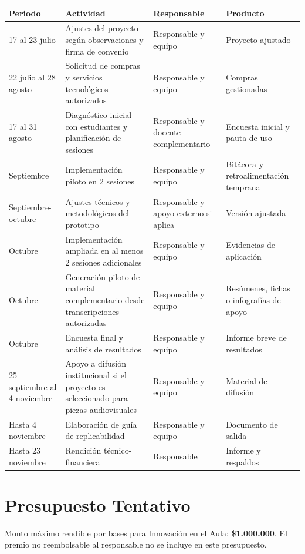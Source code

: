 \documentclass[11pt,letterpaper]{article}
\begin{document}
\begin{longtable}{p{3.1cm}p{5.6cm}p{3.2cm}p{3.2cm}}
\toprule
\textbf{Periodo} & \textbf{Actividad} & \textbf{Responsable} & \textbf{Producto} \\
\midrule
17 al 23 julio & Ajustes del proyecto según observaciones y firma de convenio & Responsable y equipo & Proyecto ajustado \\
22 julio al 28 agosto & Solicitud de compras y servicios tecnológicos autorizados & Responsable y equipo & Compras gestionadas \\
17 al 31 agosto & Diagnóstico inicial con estudiantes y planificación de sesiones & Responsable y docente complementario & Encuesta inicial y pauta de uso \\
Septiembre & Implementación piloto en 2 sesiones & Responsable y equipo & Bitácora y retroalimentación temprana \\
Septiembre-octubre & Ajustes técnicos y metodológicos del prototipo & Responsable y apoyo externo si aplica & Versión ajustada \\
Octubre & Implementación ampliada en al menos 2 sesiones adicionales & Responsable y equipo & Evidencias de aplicación \\
Octubre & Generación piloto de material complementario desde transcripciones autorizadas & Responsable y equipo & Resúmenes, fichas o infografías de apoyo \\
Octubre & Encuesta final y análisis de resultados & Responsable y equipo & Informe breve de resultados \\
25 septiembre al 4 noviembre & Apoyo a difusión institucional si el proyecto es seleccionado para piezas audiovisuales & Responsable y equipo & Material de difusión \\
Hasta 4 noviembre & Elaboración de guía de replicabilidad & Responsable y equipo & Documento de salida \\
Hasta 23 noviembre & Rendición técnico-financiera & Responsable & Informe y respaldos \\
\bottomrule
\end{longtable}

\section{Presupuesto Tentativo}

Monto máximo rendible por bases para Innovación en el Aula: \textbf{\$1.000.000}. El premio no reembolsable al responsable no se incluye en este presupuesto.
\end{document}
